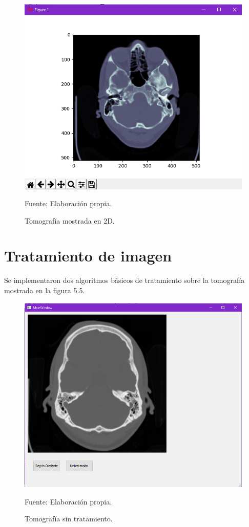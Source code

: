 \documentclass[12pt]{report}
\begin{document}
\begin{figure}[H]
\centering
\includegraphics[width = 10 cm, height = 10 cm]{visua}
\caption{Tomografía mostrada en 2D.}
Fuente: Elaboración propia.
\end{figure}

\section{Tratamiento de imagen}
Se implementaron dos algoritmos básicos de tratamiento sobre la tomografía mostrada en la figura 5.5. 


\begin{figure}[H]
\centering
\includegraphics[width = 12 cm, height = 11 cm]{origin}
\caption{Tomografía sin tratamiento.}
Fuente: Elaboración propia.
\end{figure}
\end{document}
